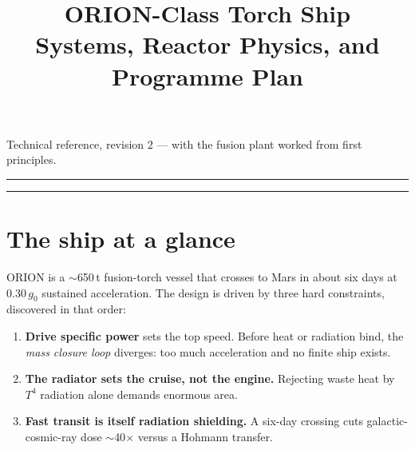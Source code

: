 \documentclass[11pt]{article}
\title{\textbf{ORION-Class Torch Ship}\\[3pt]\large Systems, Reactor Physics, and Programme Plan}
\author{}\date{}
\newcommand{\gz}{g_0}
\begin{document}
\maketitle
\vspace{-2.4em}
\begin{center}\small Technical reference, revision 2 --- with the fusion plant worked from first principles.\end{center}
\hrule
\tableofcontents
\hrule
\vspace{0.8em}

\section{The ship at a glance}
ORION is a $\sim$650\,t fusion-torch vessel that crosses to Mars in about six days at $0.30\,\gz$ sustained acceleration. The design is driven by three hard constraints, discovered in that order:
\begin{enumerate}\itemsep1pt
\item \textbf{Drive specific power} sets the top speed. Before heat or radiation bind, the \emph{mass closure loop} diverges: too much acceleration and no finite ship exists.
\item \textbf{The radiator sets the cruise, not the engine.} Rejecting waste heat by $T^4$ radiation alone demands enormous area.
\item \textbf{Fast transit is itself radiation shielding.} A six-day crossing cuts galactic-cosmic-ray dose $\sim$40$\times$ versus a Hohmann transfer.
\end{enumerate}
\end{document}
